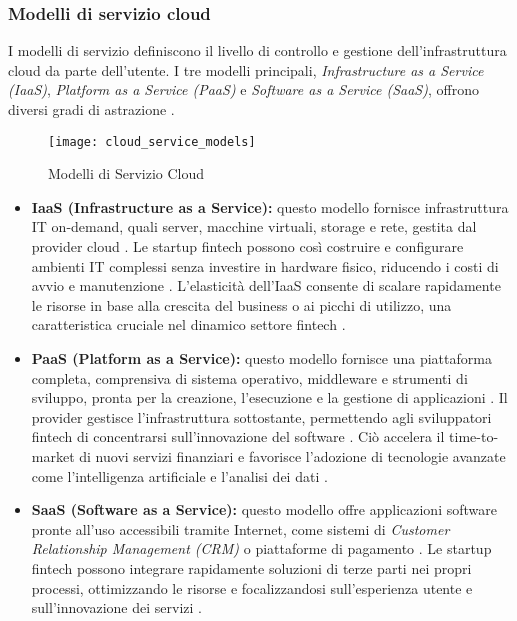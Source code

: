 \subsubsection{Modelli di servizio cloud}

I modelli di servizio definiscono il livello di controllo e gestione dell'infrastruttura cloud da parte dell'utente. I tre modelli principali, \textit{Infrastructure as a Service (IaaS)}, \textit{Platform as a Service (PaaS)} e \textit{Software as a Service (SaaS)}, offrono diversi gradi di astrazione \cite{redhat2025cloud}.

\begin{figure}[htbp]
    \centering
    \texttt{[image: cloud\_service\_models]}
    \caption{Modelli di Servizio Cloud}
    \label{fig:service_models}
\end{figure}

\begin{itemize}
    \item \textbf{IaaS (Infrastructure as a Service):} questo modello fornisce infrastruttura IT on-demand, quali server, macchine virtuali, storage e rete, gestita dal provider cloud \cite{redhat2025cloud}. Le startup fintech possono così costruire e configurare ambienti IT complessi senza investire in hardware fisico, riducendo i costi di avvio e manutenzione \cite{vats2024systematic}. L'elasticità dell'IaaS consente di scalare rapidamente le risorse in base alla crescita del business o ai picchi di utilizzo, una caratteristica cruciale nel dinamico settore fintech \cite{vats2024systematic, hrmars2025cloud}.
    
    \item \textbf{PaaS (Platform as a Service):} questo modello fornisce una piattaforma completa, comprensiva di sistema operativo, middleware e strumenti di sviluppo, pronta per la creazione, l'esecuzione e la gestione di applicazioni \cite{redhat2025cloud}. Il provider gestisce l'infrastruttura sottostante, permettendo agli sviluppatori fintech di concentrarsi sull'innovazione del software \cite{vats2024systematic}. Ciò accelera il time-to-market di nuovi servizi finanziari e favorisce l'adozione di tecnologie avanzate come l'intelligenza artificiale e l'analisi dei dati \cite{vats2024systematic}.
    
    \item \textbf{SaaS (Software as a Service):} questo modello offre applicazioni software pronte all'uso accessibili tramite Internet, come sistemi di \textit{Customer Relationship Management (CRM)} o piattaforme di pagamento \cite{redhat2025cloud}. Le startup fintech possono integrare rapidamente soluzioni di terze parti nei propri processi, ottimizzando le risorse e focalizzandosi sull'esperienza utente e sull'innovazione dei servizi \cite{vats2024systematic}.
\end{itemize}

